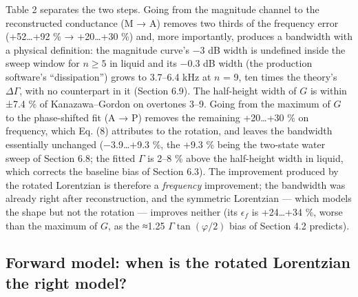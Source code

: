 \documentclass[11pt,a4paper]{article}
\begin{document}
Table 2 separates the two steps. Going from the magnitude channel to the
reconstructed conductance (M → A) removes two thirds of the frequency
error (+52\ldots+92 \% → +20\ldots+30 \%) and, more importantly,
produces a bandwidth with a physical definition: the magnitude curve's
−3 dB width is undefined inside the sweep window for \(n \ge 5\) in
liquid and its −0.3 dB width (the production software's ``dissipation'')
grows to 3.7--6.4 kHz at \(n\) = 9, ten times the theory's
\(\Delta\Gamma\), with no counterpart in it (Section 6.9). The
half-height width of \(G\) is within ±7.4 \% of Kanazawa--Gordon on
overtones 3--9. Going from the maximum of \(G\) to the phase-shifted fit
(A → P) removes the remaining +20\ldots+30 \% on frequency, which Eq.
(8) attributes to the rotation, and leaves the bandwidth essentially
unchanged (−3.9\ldots+9.3 \%, the +9.3 \% being the two-state water
sweep of Section 6.8; the fitted \(\Gamma\) is 2--8 \% above the
half-height width in liquid, which corrects the baseline bias of Section
6.3). The improvement produced by the rotated Lorentzian is therefore a
\emph{frequency} improvement; the bandwidth was already right after
reconstruction, and the symmetric Lorentzian --- which models the shape
but not the rotation --- improves neither (its \(\epsilon_f\) is
+24\ldots+34 \%, worse than the maximum of \(G\), as the ≈1.25
\(\Gamma\tan(\varphi/2)\) bias of Section 4.2 predicts).

\hypertarget{forward-model-when-is-the-rotated-lorentzian-the-right-model}{%
\subsection{Forward model: when is the rotated Lorentzian the right
model?}\label{forward-model-when-is-the-rotated-lorentzian-the-right-model}}
\end{document}
